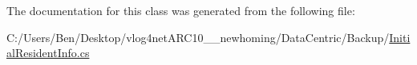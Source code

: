 The documentation for this class was generated from the following file\-:\begin{DoxyCompactItemize}
\item 
C\-:/\-Users/\-Ben/\-Desktop/vlog4net\-A\-R\-C10\-\_\-\_\-newhoming/\-Data\-Centric/\-Backup/\hyperlink{_backup_2_initial_resident_info_8cs}{Initial\-Resident\-Info.\-cs}\end{DoxyCompactItemize}
